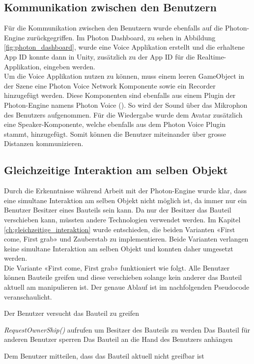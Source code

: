 \subsection{Kommunikation zwischen den Benutzern}
\label{ch:kommunikation_zwischen_benutzern_realisierung}
Für die Kommunikation zwischen den Benutzern wurde ebenfalls auf die Photon-Engine zurückgegriffen. Im Photon Dashboard, zu sehen in Abbildung \ref{fig:photon_dashboard}, wurde eine Voice Applikation erstellt und die erhaltene App ID konnte dann in Unity, zusätzlich zu der App ID für die Realtime-Applikation, eingeben werden. \\

\noindent Um die Voice Applikation nutzen zu können, muss einem leeren GameObject in der Szene eine \grqq Photon Voice Network\grqq{} Komponente sowie ein \grqq Recorder\grqq{} hinzugefügt werden. Diese Komponenten sind ebenfalls aus einem Plugin der Photon-Engine namens Photon Voice (\cite{noauthor_photon_2019-1}). So wird der Sound über das Mikrophon des Benutzers aufgenommen. Für die Wiedergabe wurde dem Avatar zusätzlich eine \grqq Speaker\grqq{}-Komponente, welche ebenfalls aus dem Photon Voice Plugin stammt, hinzugefügt. Somit können die Benutzer miteinander über grosse Distanzen kommunizieren. 

\subsection{Gleichzeitige Interaktion am selben Objekt}
\label{ch:gleichzeitige_interaktion_realisierung}

Durch die Erkenntnisse während Arbeit mit der Photon-Engine wurde klar, dass eine simultane Interaktion am selben Objekt nicht möglich ist, da immer nur ein Benutzer Besitzer eines Bauteils sein kann. Da nur der Besitzer das Bauteil verschieben kann, müssten andere Technologien verwendet werden. Im Kapitel \ref{ch:gleichzeitige_interaktion} wurde entschieden, die beiden Varianten «First come, First grab» und Zauberstab zu implementieren. Beide Varianten verlangen keine simultane Interaktion am selben Objekt und konnten daher umgesetzt werden. \\

\noindent Die Variante «First come, First grab» funktioniert wie folgt. Alle Benutzer können Bauteile greifen und diese verschieben solange kein anderer das Bauteil aktuell am manipulieren ist. Der genaue Ablauf ist im nachfolgenden Pseudocode veranschaulicht.

\begin{algorithm}
	Der Benutzer versucht das Bauteil zu greifen\;
	 {
		\textit{RequestOwnerShip()} aufrufen um Besitzer des Bauteils zu werden\;
		Das Bauteil für anderen Benutzer sperren\;
		Das Bauteil an die Hand des Benutzers anhängen\;
		
	}{
		Dem Benutzer mitteilen, dass das Bauteil aktuell nicht greifbar ist\;	
	}
\end{algorithm}

